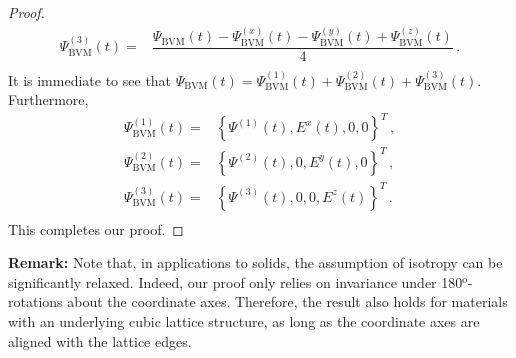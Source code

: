 \documentclass[a4paper, amsfonts, amssymb, amsmath, reprint, showkeys, nofootinbib, twoside,notitlepage,onecolumn]{revtex4-1}
\theoremstyle{definition}
\theoremstyle{theorem}
\begin{document}
\begin{proof}
\begin{equation}
\begin{split}
\Psi_{\text{BVM}}^{(3)}(t)={}& \dfrac{\Psi_{\text{BVM}}(t)- \Psi_{\text{BVM}}^{(x)}(t)-\Psi_{\text{BVM}}^{(y)}(t)+ \Psi_{\text{BVM}}^{(z)}(t)}{4} \, . \\
\end{split}
\end{equation}
It is immediate to see that $\Psi_{\text{BVM}}(t)=\Psi_{\text{BVM}}^{(1)}(t)+\Psi_{\text{BVM}}^{(2)}(t)+\Psi_{\text{BVM}}^{(3)}(t)$. Furthermore,
\begin{equation}
\begin{split}
\Psi_{\text{BVM}}^{(1)}(t)={}& \left\{\Psi^{(1)}(t),E^x(t),0,0\right\}^T \, , \\
\Psi_{\text{BVM}}^{(2)}(t)={}& \left\{\Psi^{(2)}(t),0,E^y(t),0\right\}^T \, , \\
\Psi_{\text{BVM}}^{(3)}(t)={}& \left\{\Psi^{(3)}(t),0,0,E^z(t)\right\}^T \, . \\
\end{split}
\end{equation}
This completes our proof.    
\end{proof}
\textbf{Remark:} Note that, in applications to solids, the assumption of isotropy can be significantly relaxed. Indeed, our proof only relies on invariance under 180$^{\text{o}}$-rotations about the coordinate axes. Therefore, the result also holds for materials with an underlying cubic lattice structure, as long as the coordinate axes are aligned with the lattice edges.






\label{lastpage}
\end{document}
